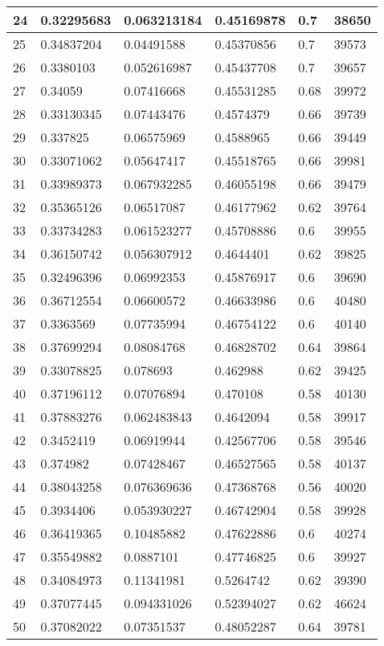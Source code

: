 \begin{longtable}{|l|l|l|l|l|l|}
24 & 0.32295683 & 0.063213184 & 0.45169878 & 0.7 & 38650 \\ \hline 
25 & 0.34837204 & 0.04491588 & 0.45370856 & 0.7 & 39573 \\ \hline 
26 & 0.3380103 & 0.052616987 & 0.45437708 & 0.7 & 39657 \\ \hline 
27 & 0.34059 & 0.07416668 & 0.45531285 & 0.68 & 39972 \\ \hline 
28 & 0.33130345 & 0.07443476 & 0.4574379 & 0.66 & 39739 \\ \hline 
29 & 0.337825 & 0.06575969 & 0.4588965 & 0.66 & 39449 \\ \hline 
30 & 0.33071062 & 0.05647417 & 0.45518765 & 0.66 & 39981 \\ \hline 
31 & 0.33989373 & 0.067932285 & 0.46055198 & 0.66 & 39479 \\ \hline 
32 & 0.35365126 & 0.06517087 & 0.46177962 & 0.62 & 39764 \\ \hline 
33 & 0.33734283 & 0.061523277 & 0.45708886 & 0.6 & 39955 \\ \hline 
34 & 0.36150742 & 0.056307912 & 0.4644401 & 0.62 & 39825 \\ \hline 
35 & 0.32496396 & 0.06992353 & 0.45876917 & 0.6 & 39690 \\ \hline 
36 & 0.36712554 & 0.06600572 & 0.46633986 & 0.6 & 40480 \\ \hline 
37 & 0.3363569 & 0.07735994 & 0.46754122 & 0.6 & 40140 \\ \hline 
38 & 0.37699294 & 0.08084768 & 0.46828702 & 0.64 & 39864 \\ \hline 
39 & 0.33078825 & 0.078693 & 0.462988 & 0.62 & 39425 \\ \hline 
40 & 0.37196112 & 0.07076894 & 0.470108 & 0.58 & 40130 \\ \hline 
41 & 0.37883276 & 0.062483843 & 0.4642094 & 0.58 & 39917 \\ \hline 
42 & 0.3452419 & 0.06919944 & 0.42567706 & 0.58 & 39546 \\ \hline 
43 & 0.374982 & 0.07428467 & 0.46527565 & 0.58 & 40137 \\ \hline 
44 & 0.38043258 & 0.076369636 & 0.47368768 & 0.56 & 40020 \\ \hline 
45 & 0.3934406 & 0.053930227 & 0.46742904 & 0.58 & 39928 \\ \hline 
46 & 0.36419365 & 0.10485882 & 0.47622886 & 0.6 & 40274 \\ \hline 
47 & 0.35549882 & 0.0887101 & 0.47746825 & 0.6 & 39927 \\ \hline 
48 & 0.34084973 & 0.11341981 & 0.5264742 & 0.62 & 39390 \\ \hline 
49 & 0.37077445 & 0.094331026 & 0.52394027 & 0.62 & 46624 \\ \hline 
50 & 0.37082022 & 0.07351537 & 0.48052287 & 0.64 & 39781 \\ \hline 
\end{longtable}